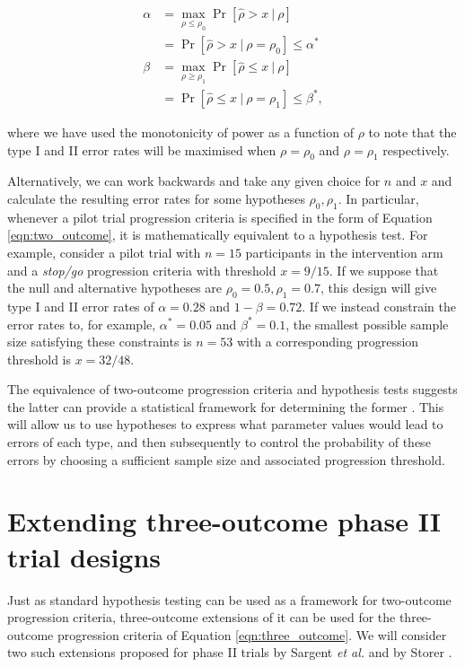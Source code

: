 \documentclass[referee, lineno, pdflatex,sn-vancouver,Numbered]{sn-jnl}%
\theoremstyle{thmstyleone}%
\theoremstyle{thmstyletwo}%
\theoremstyle{thmstylethree}%
\begin{document}
\begin{align}
\alpha &= \max_{\rho \leq \rho_0} \Pr[ \hat{\rho} > x ~ | ~ \rho]  \nonumber \\
&= \Pr[ \hat{\rho} > x ~ | ~ \rho = \rho_0] \leq \alpha^* \\
\beta &= \max_{\rho \geq \rho_1} \Pr[ \hat{\rho} \leq x ~ | ~ \rho]  \nonumber \\
&= \Pr[ \hat{\rho} \leq x ~ | ~ \rho = \rho_1] \leq \beta^*,
\end{align}

where we have used the monotonicity of power as a function of $\rho$ to note that the type I and II error rates will be maximised when $\rho = \rho_0$ and $\rho = \rho_1$ respectively.

Alternatively, we can work backwards and take any given choice for $n$ and $x$ and calculate the resulting error rates for some hypotheses $\rho_0, \rho_1$. In particular, whenever a pilot trial progression criteria is specified in the form of Equation \ref{eqn:two_outcome}, it is mathematically equivalent to a hypothesis test. For example, consider a pilot trial with $n = 15$ participants in the intervention arm and a \emph{stop/go} progression criteria with threshold $x = 9/15$. If we suppose that the null and alternative hypotheses are $\rho_0 = 0.5, \rho_1 = 0.7$, this design will give type I and II error rates of $\alpha = 0.28$ and $1 - \beta = 0.72$. If we instead constrain the error rates to, for example, $\alpha^* = 0.05$ and $\beta^* = 0.1$, the smallest possible sample size satisfying these constraints is $n = 53$ with a corresponding progression threshold is $x = 32/48$. 

The equivalence of two-outcome progression criteria and hypothesis tests suggests the latter can provide a statistical framework for determining the former \cite{Lewis2021a}. This will allow us to use hypotheses to express what parameter values would lead to errors of each type, and then subsequently to control the probability of these errors by choosing a sufficient sample size and associated progression threshold.

\section{Extending three-outcome phase II trial designs}\label{sec:review}

Just as standard hypothesis testing can be used as a framework for two-outcome progression criteria, three-outcome extensions of it can be used for the three-outcome progression criteria of Equation \ref{eqn:three_outcome}. We will consider two such extensions proposed for phase II trials by Sargent \emph{et al.} \cite{Sargent2001} and by Storer \cite{Storer1992}.
\end{document}
